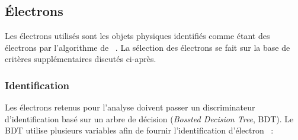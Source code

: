 \subsection{Électrons}\label{chapter-HTT_analysis-section-objects-electrons}
Les électrons utilisés sont les objets physiques identifiés comme étant des électrons par l'algorithme de \PF~\cite{particle-flow}.
La sélection des électrons se fait sur la base de critères supplémentaires discutés ci-après.

\subsubsection{Identification}\label{chapter-HTT_analysis-section-objects-muons-ID}
Les électrons retenus pour l'analyse doivent passer un discriminateur d'identification basé sur un arbre de décision (\emph{Bossted Decision Tree}, BDT).
Le BDT utilise plusieurs variables afin de fournir l'identification d'électron \og \EleIDMVA \fg~\cite{cmsElectronMVA}:
